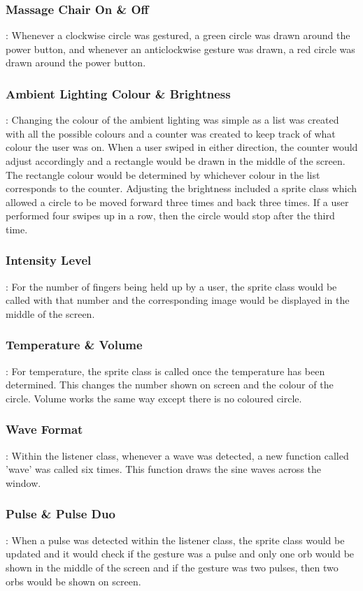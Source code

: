 \documentclass{l4proj}
\begin{document}
\subsubsection{Massage Chair On \& Off}: Whenever a clockwise circle was gestured, a green circle was drawn around the power button, and whenever an anticlockwise gesture was drawn, a red circle was drawn around the power button.

\subsubsection{Ambient Lighting Colour \& Brightness}: Changing the colour of the ambient lighting was simple as a list was created with all the possible colours and a counter was created to keep track of what colour the user was on. When a user swiped in either direction, the counter would adjust accordingly and a rectangle would be drawn in the middle of the screen. The rectangle colour would be determined by whichever colour in the list corresponds to the counter. Adjusting the brightness included a sprite class which allowed a circle to be moved forward three times and back three times. If a user performed four swipes up in a row, then the circle would stop after the third time.

\subsubsection{Intensity Level}: For the number of fingers being held up by a user, the sprite class would be called with that number and the corresponding image would be displayed in the middle of the screen.

\subsubsection{Temperature \& Volume}: For temperature, the sprite class is called once the temperature has been determined. This changes the number shown on screen and the colour of the circle. Volume works the same way except there is no coloured circle.

\subsubsection{Wave Format}: Within the listener class, whenever a wave was detected, a new function called 'wave' was called six times. This function draws the sine waves across the window. 
\subsubsection{Pulse \& Pulse Duo}: When a pulse was detected within the listener class, the sprite class would be updated and it would check if the gesture was a pulse and only one orb would be shown in the middle of the screen and if the gesture was two pulses, then two orbs would be shown on screen.
\end{document}
